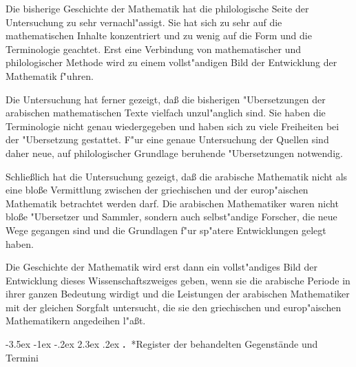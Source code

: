 \documentclass[11pt,a4paper]{article}
\makeatletter
\renewcommand{\section}{\@startsection{section}{1}{\z@}%
  {-3.5ex \@plus -1ex \@minus -.2ex}%
  {2.3ex \@plus .2ex}%
  {\normalfont\Large\bfseries\color{sectioncolor}\thesection.\ }}
\makeatother
\begin{document}
Die bisherige Geschichte der Mathematik hat die philologische Seite der Untersuchung zu sehr vernachl"assigt. Sie hat sich zu sehr auf die mathematischen Inhalte konzentriert und zu wenig auf die Form und die Terminologie geachtet. Erst eine Verbindung von mathematischer und philologischer Methode wird zu einem vollst"andigen Bild der Entwicklung der Mathematik f"uhren.

Die Untersuchung hat ferner gezeigt, da\ss{} die bisherigen "Ubersetzungen der arabischen mathematischen Texte vielfach unzul"anglich sind. Sie haben die Terminologie nicht genau wiedergegeben und haben sich zu viele Freiheiten bei der "Ubersetzung gestattet. F"ur eine genaue Untersuchung der Quellen sind daher neue, auf philologischer Grundlage beruhende "Ubersetzungen notwendig.

Schlie\ss{}lich hat die Untersuchung gezeigt, da\ss{} die arabische Mathematik nicht als eine blo\ss{}e Vermittlung zwischen der griechischen und der europ"aischen Mathematik betrachtet werden darf. Die arabischen Mathematiker waren nicht blo\ss{}e "Ubersetzer und Sammler, sondern auch selbst"andige Forscher, die neue Wege gegangen sind und die Grundlagen f"ur sp"atere Entwicklungen gelegt haben.

Die Geschichte der Mathematik wird erst dann ein vollst"andiges Bild der Entwicklung dieses Wissenschaftszweiges geben, wenn sie die arabische Periode in ihrer ganzen Bedeutung wirdigt und die Leistungen der arabischen Mathematiker mit der gleichen Sorgfalt untersucht, die sie den griechischen und europ"aischen Mathematikern angedeihen l"a\ss{}t.

\clearpage

\section*{Register der behandelten Gegenst\"ande und Termini}
\end{document}
